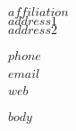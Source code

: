 \documentclass[$fontsize$,letterpaper,oneside]{article}
\date{}
\begin{document}
\thispagestyle{empty}

\begin{minipage}[t]{3.5in} 
  \flushright 
  \footnotesize {$affiliation$} \\
  \footnotesize {$address1$} \\
  \footnotesize {$address2$} 
\end{minipage}
\hfill     
\hfill
\begin{minipage}[t]{2in}
  \flushright 
  \footnotesize {$phone$} \, \faPhone \\
  {\footnotesize {\href{mailto:$email$}{$email$}} \, \faEnvelope} \\
  {\footnotesize {\href{https://www.$web$}{$web$}} \, \faGlobe}
\end{minipage}

\vspace{3em}

\reversemarginpar

\vspace{1em}

$body$
	
\end{document}
